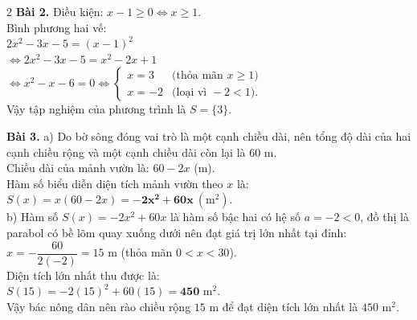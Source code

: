 \documentclass[10pt,a4paper]{article}
\begin{document}
\begin{multicols}{2}
\textbf{Bài 2.}
Điều kiện: $x - 1 \ge 0 \Leftrightarrow x \ge 1$.\\
Bình phương hai vế:\\
$2x^2 - 3x - 5 = (x - 1)^2$\\
$\Leftrightarrow 2x^2 - 3x - 5 = x^2 - 2x + 1$\\
$\Leftrightarrow x^2 - x - 6 = 0 \Leftrightarrow \begin{cases} x = 3 & \text{(thỏa mãn } x \ge 1) \\ x = -2 & \text{(loại vì } -2 < 1). \end{cases}$\\
Vậy tập nghiệm của phương trình là $S = \{3\}$.

\textbf{Bài 3.}
a) Do bờ sông đóng vai trò là một cạnh chiều dài, nên tổng độ dài của hai cạnh chiều rộng và một cạnh chiều dài còn lại là $60\text{ m}$.\\
Chiều dài của mảnh vườn là: $60 - 2x$ (m).\\
Hàm số biểu diễn diện tích mảnh vườn theo $x$ là:\\
$S(x) = x(60 - 2x) = \mathbf{-2x^2 + 60x}\ (\text{m}^2)$.\\
b) Hàm số $S(x) = -2x^2 + 60x$ là hàm số bậc hai có hệ số $a = -2 < 0$, đồ thị là parabol có bề lõm quay xuống dưới nên đạt giá trị lớn nhất tại đỉnh:\\
$x = -\dfrac{60}{2(-2)} = 15\text{ m}$ (thỏa mãn $0 < x < 30$).\\
Diện tích lớn nhất thu được là:\\
$S(15) = -2(15)^2 + 60(15) = \mathbf{450}\text{ m}^2$.\\
Vậy bác nông dân nên rào chiều rộng $15\text{ m}$ để đạt diện tích lớn nhất là $450\text{ m}^2$.

\end{multicols}
\end{document}

